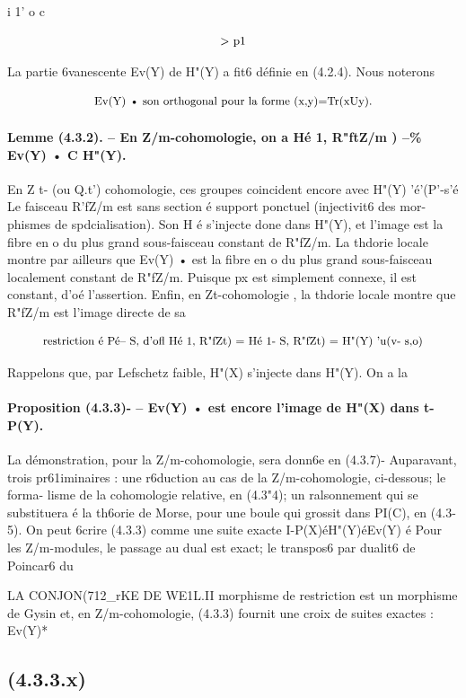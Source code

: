 \documentclass[11pt]{article}
\theoremstyle{remark}
\begin{document}
i 1' o c

\[\text{\small > p1}\]

La partie 6vanescente Ev(Y) de H"(Y) a fit6 définie en (4.2.4). Nous noterons

\[\text{\small Ev(Y) • son orthogonal pour la forme (x,y)=Tr(xUy).}\]

\paragraph{Lemme (4.3.2). -- En Z/m-cohomologie, on a Hé 1, R"ftZ/m ) --\% Ev(Y) • C H"(Y).}

En Z t- (ou Q.t') cohomologie, ces groupes coincident encore avec H"(Y) 'é'(P'-s'é Le faisceau R'fZ/m est sans section é support ponctuel (injectivit6 des mor- phismes de spdcialisation). Son H é s'injecte done dans H"(Y), et l'image est la fibre en o du plus grand sous-faisceau constant de R"fZ/m. La thdorie locale montre par ailleurs que Ev(Y) • est la fibre en o du plus grand sous-faisceau localement constant de R"fZ/m. Puisque px est simplement connexe, il est constant, d'oé l'assertion. Enfin, en Zt-cohomologie , la thdorie locale montre que R"fZ/m est l'image directe de sa

\[\text{\small restriction é Pé-- S, d'ofl Hé 1, R"fZt) = Hé 1- S, R"fZt) = H"(Y) 'u(v- s,o)}\]

Rappelons que, par Lefschetz faible, H"(X) s'injecte dans H"(Y). On a la

\paragraph{Proposition (4.3.3)- -- Ev(Y) • est encore l'image de H"(X) dans t-P(Y).}

La démonstration, pour la Z/m-cohomologie, sera donn6e en (4.3.7)- Auparavant, trois pr61iminaires : une r6duction au cas de la Z/m-cohomologie, ci-dessous; le forma- lisme de la cohomologie relative, en (4.3"4); un ralsonnement qui se substituera é la th6orie de Morse, pour une boule qui grossit dans PI(C), en (4.3-5). On peut 6crire (4.3.3) comme une suite exacte I-P(X)éH"(Y)éEv(Y) é Pour les Z/m-modules, le passage au dual est exact; le transpos6 par dualit6 de Poincar6 du

LA CONJON(712\_rKE DE WE1L.II morphisme de restriction est un morphisme de Gysin et, en Z/m-cohomologie, (4.3.3) fournit une croix de suites exactes : Ev(Y)*

\subsection*{(4.3.3.x)}
\end{document}
